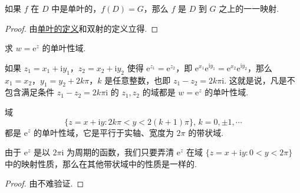 \documentclass[../../main.tex]{subfiles}
\begin{document}
\begin{proposition}
如果 \( f \) 在 \( D \) 中是单叶的，\( f(D) = G \)，那么 \( f \) 是 \( D \) 到 \( G \) 之上的一一映射.
\end{proposition}
\begin{proof}
由\hyperref[definition:单叶性域]{单叶的定义}和双射的定义立得.
\end{proof}

\begin{proposition}\label{proposition:复变函数的指数函数的单叶性域}
求 \( w = \mathrm{e}^z \) 的单叶性域.
\end{proposition}
\begin{solution}
如果 \( z_1 = x_1 + \mathrm{i}y_1 \)，\( z_2 = x_2 + \mathrm{i}y_2 \) 使得 \( \mathrm{e}^{z_1} = \mathrm{e}^{z_2} \)，即 \( \mathrm{e}^{x_1} \mathrm{e}^{\mathrm{i}y_1} = \mathrm{e}^{x_2} \mathrm{e}^{\mathrm{i}y_2} \)，那么 \( x_1 = x_2 \)，\( y_1 = y_2 + 2k\pi \)，\( k \) 是任意整数，也即 \( z_1 - z_2 = 2k\pi \mathrm{i} \). 这就是说，凡是不包含满足条件 \( z_1 - z_2 = 2k\pi \mathrm{i} \) 的 \( z_1, z_2 \) 的域都是 \( w = \mathrm{e}^z \) 的单叶性域. 
\end{solution}

\begin{proposition}
域
\[
\{ z = x + \mathrm{i}y : 2k\pi < y < 2(k + 1)\pi \}, \, k = 0, \pm 1, \cdots
\]
都是 \( \mathrm{e}^z \) 的单叶性域，它是平行于实轴、宽度为 \( 2\pi \) 的带状域.
\end{proposition}
\begin{note}
由于 \( \mathrm{e}^z \) 是以 \( 2\pi \mathrm{i} \) 为周期的函数，我们只要弄清 \( \mathrm{e}^z \) 在域 \( \{ z = x + \mathrm{i}y : 0 < y < 2\pi \} \) 中的映射性质，那么在其他带状域中的性质是一样的.
\end{note}
\begin{proof}
由不难验证.
\end{proof}
\end{document}
